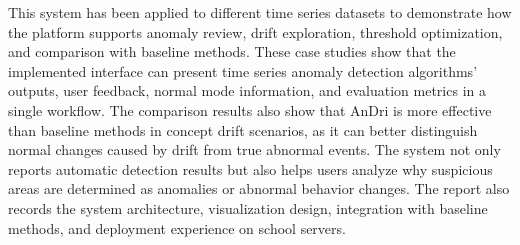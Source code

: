 This system has been applied to different time series datasets to demonstrate how the platform supports anomaly review, drift exploration, threshold optimization, and comparison with baseline methods. These case studies show that the implemented interface can present time series anomaly detection algorithms' outputs, user feedback, normal mode information, and evaluation metrics in a single workflow. The comparison results also show that AnDri is more effective than baseline methods in concept drift scenarios, as it can better distinguish normal changes caused by drift from true abnormal events. The system not only reports automatic detection results but also helps users analyze why suspicious areas are determined as anomalies or abnormal behavior changes. The report also records the system architecture, visualization design, integration with baseline methods, and deployment experience on school  servers. 


